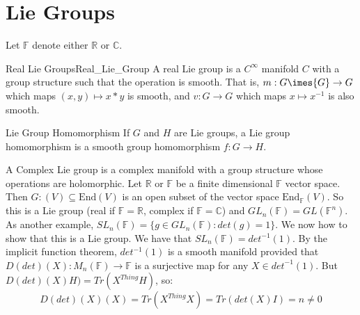 \documentclass[crop=false,class=book,oneside]{standalone}                      %
\begin{document}
    \section{Lie Groups}
        Let $\mathbb{F}$ denote either $\mathbb{R}$ or $\mathbb{C}$.
        \begin{ldefinition}{Real Lie Groups}{Real_Lie_Group}
            A real Lie group is a $C^{\infty}$ manifold $C$ with a group
            structure such that the operation is smooth. That is,
            $m:G\imes{G}\rightarrow{G}$ which maps $(x,y)\mapsto{x}*y$ is
            smooth, and $v:G\rightarrow{G}$ which maps
            $x\mapsto{x}^{\minus{1}}$ is also smooth.
        \end{ldefinition}
        \begin{ldefinition}{Lie Group Homomorphism}{}
            If $G$ and $H$ are Lie groups, a Lie group homomorphism is a
            smooth group homomorphism $f:G\rightarrow{H}$.
        \end{ldefinition}
        \begin{example}
            A Complex Lie group is a complex manifold with a group structure
            whose operations are holomorphic. Let $\mathbb{R}$ or
            $\mathbb{F}$ be a finite dimensional $\mathbb{F}$ vector space.
            Then $G:(V)\subseteq\textrm{End}(V)$ is an open subset of
            the vector space $\textrm{End}_{\mathbb{F}}(V)$. So this is
            a Lie group (real if $\mathbb{F}=\mathbb{R}$, complex if
            $\mathbb{F}=\mathbb{C}$) and
            $GL_{n}(\mathbb{F})=GL(\mathbb{F}^{n})$. As another example,
            $SL_{n}(\mathbb{F})=\{g\in{GL}_{n}(\mathbb{F}):det(g)=1\}$.
            We now how to show that this is a Lie group. We have that
            $SL_{n}(\mathbb{F})=det^{\minus{1}}(1)$. By the implicit
            function theorem, $det^{\minus{1}}(1)$ is a smooth
            manifold provided that
            $D(det)(X):M_{n}(\mathbb{F})\rightarrow\mathbb{F}$ is a
            surjective map for any $X\in{det}^{\minus{1}}(1)$. But
            $D(det)(X)H)=Tr(X^{Thing}H)$, so:
            \begin{equation}
                D(det)(X)(X)=Tr(X^{Thing}X)=Tr(det(X)I)=n\ne{0}
            \end{equation}
        \end{example}
\end{document}
